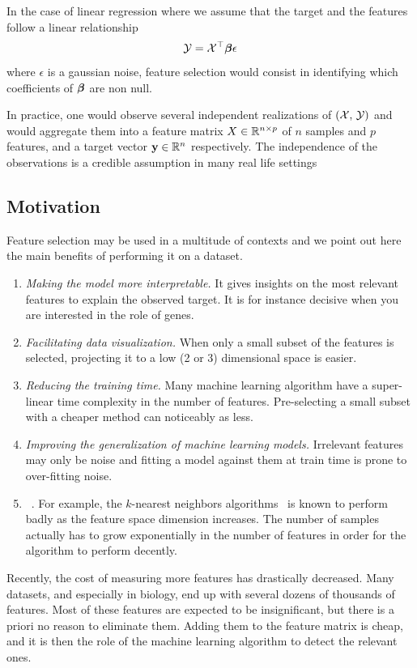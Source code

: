 In the case of linear regression where we assume that the target and the features follow a linear relationship
\begin{equation*}
    \mathcal{Y} = \mathcal{X}^\top \bm{\beta} \epsilon
\end{equation*}
where $\epsilon$ is a gaussian noise,
feature selection would consist in identifying which coefficients of $\bm{\beta}$ are non null.

In practice, one would observe several independent realizations of
$\left( \mathcal{X},\, \mathcal{Y} \right)$ and would aggregate them into a feature matrix
$X \in \mathbb{R}^{n \times p}$ of $n$ samples and $p$ features, and a target vector $\mathbf{y} \in \mathbb{R}^n$ respectively.
The independence of the observations is a credible assumption in many real life settings

\subsection{Motivation}\label{subsec:fs_motivation}

Feature selection may be used in a multitude of contexts and we point out here the main benefits of
performing it on a dataset.
\begin{enumerate}
    \item \textit{Making the model more interpretable.}
    It gives insights on the most relevant features to explain the observed target.
    It is for instance decisive when you are interested in the role of genes.
    \item \textit{Facilitating data visualization.}
    When only a small subset of the features is selected,
    projecting it to a low (2 or 3) dimensional space is easier.
    \item \textit{Reducing the training time.}
    Many machine learning algorithm have a super-linear time complexity in the number of features.
    Pre-selecting a small subset with a cheaper method can noticeably as less\citep{high_dimensional_fs}.
    \item \textit{Improving the generalization of machine learning models.}
    Irrelevant features may only be noise and fitting a model against them at train time
    is prone to over-fitting noise.
    \item {}~\citep{curse_dimensionality}.
    For example, the $k$-nearest neighbors algorithms~\citep{knn} is known to perform badly as the feature space
    dimension increases.
    The number of samples actually has to grow exponentially in the number of features in order for the algorithm
    to perform decently.
\end{enumerate}
Recently, the cost of measuring more features has drastically decreased.
Many datasets, and especially in biology, end up with several dozens of thousands of features.
Most of these features are expected to be insignificant, but there is a priori no reason to eliminate them.
Adding them to the feature matrix is cheap, and it is then the role of the machine learning algorithm
to detect the relevant ones.

